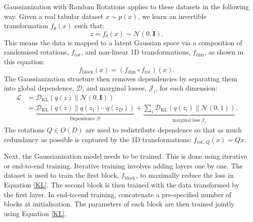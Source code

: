 \documentclass[11pt]{report} %
\begin{document}
Gaussianization with Random Rotations applies to these datasets in the following way. Given a real tabular dataset \( x \sim p(x) \), we learn an {invertible transformation} \( f_\theta(x) \) such that:
  \[
  z = f_\theta(x) \sim \mathcal{N}({0}, \mathbf{I}).
  \]
This means the data is mapped to a {latent Gaussian space} via a composition of randomised {rotations}, \( f_{\mathrm{rot}} \), and {non-linear 1D transformations}, \( f_{\mathrm{dim}} \), as shown in this equation:
\[
  f_{\mathrm{block}}(x) = (f_{\mathrm{dim}} \circ f_{\mathrm{rot}})(x).
\]
The Gaussianization structure then removes dependencies by separating them into global dependence, \( \mathcal{D} \), and {marginal losses}, \( \mathcal{J}_i \), for each dimension: 
\begin{align*}
\mathcal{L} &= \mathcal{D}_{\text{KL}}\left( q(z) \middle\| \mathcal{N}(0, \mathbf{I}) \right) \\
            &= \underbrace{\mathcal{D}_{\text{KL}}\left( q(z) \middle\| q(z_1) \cdots q(z_D) \right)}_{\text{Dependence } \mathcal{D}} 
            + \underbrace{\sum_i \mathcal{D}_{\text{KL}}\left( q(z_i) \middle\| \mathcal{N}(0, 1) \right)}_{\text{marginal loss } \mathcal{J}_i}.
\end{align*}
\noindent The rotations \( Q \in O(D) \) are used to {redistribute dependence} so that as much redundancy as possible is captured by the 1D transformations: \(f_{\text{rot},\, Q}(x) = Qx.
\)


Next, the Gaussianization model needs to be trained. This is done using iterative or end-to-end training. 
Iterative training involves adding layers one by one. The dataset is used to train the first block, $f_\text{block}$, to maximally reduce
the loss in Equation \ref{KL}. The second block is then trained with the data transformed by the first layer.
In end-to-end training, concatenate a pre-specified number of blocks at initialisation.\cite{meng2020gaussianization} The parameters of each block are then trained jointly using Equation \ref{KL}.
\end{document}
